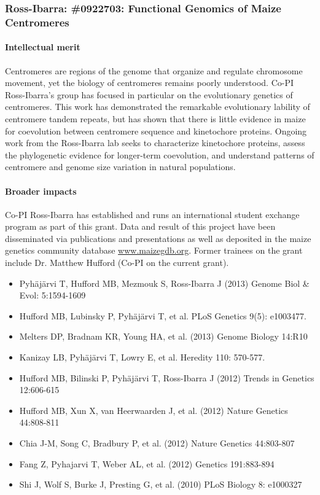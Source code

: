 

\subsubsection*{Ross-Ibarra: \#0922703: Functional Genomics of Maize Centromeres}
\paragraph*{Intellectual merit} Centromeres are regions of the genome that organize and regulate chromosome movement, yet the biology of centromeres remains poorly understood. Co-PI Ross-Ibarra's group has focused in particular on the evolutionary genetics of centromeres. This work has demonstrated the remarkable evolutionary lability of centromere tandem repeats, but has shown that there is little evidence in maize for coevolution between centromere sequence and kinetochore proteins. Ongoing work from the Ross-Ibarra lab seeks to characterize kinetochore proteins, assess the phylogenetic evidence for longer-term coevolution, and understand patterns of centromere and genome size variation in natural populations. 
\paragraph*{Broader impacts} Co-PI Ross-Ibarra has established and runs an international student exchange program as part of this grant. Data and result of this project have been disseminated via publications and presentations as well as deposited in the maize genetics community database \url{www.maizegdb.org}. Former trainees on the grant include Dr. Matthew Hufford (Co-PI on the current grant).
 
\begin{itemize}[noitemsep]
\item Pyh\"aj\"arvi T, Hufford MB, Mezmouk S, Ross-Ibarra J (2013) Genome Biol \& Evol:  5:1594-1609
\item Hufford MB, Lubinsky P, Pyh\"aj\"arvi T, et al. PLoS Genetics 9(5): e1003477.
\item Melters DP, Bradnam KR, Young HA, et al. (2013) Genome Biology 14:R10
\item Kanizay LB, Pyhäjärvi T, Lowry E, et al. Heredity 110: 570-577.
\item Hufford MB, Bilinski P, Pyh\"aj\"arvi T, Ross-Ibarra J (2012) Trends in Genetics 12:606-615
\item Hufford MB, Xun X, van Heerwaarden J, et al. (2012) Nature Genetics 44:808-811
\item Chia J-M, Song C, Bradbury P, et al. (2012) Nature Genetics 44:803-807
\item Fang Z, Pyhajarvi T, Weber AL, et al. (2012) Genetics 191:883-894
\item Shi J, Wolf S, Burke J, Presting G, et al.  (2010) PLoS Biology 8: e1000327
\end{itemize}

